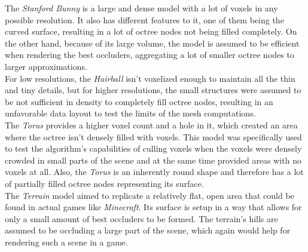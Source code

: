 \noindent
The \emph{Stanford Bunny} is a large and dense model with a lot of voxels in any possible resolution.
It also has different features to it, one of them being the curved surface, resulting in a lot of octree 
nodes not being filled completely. On the other hand, because of its large volume, the model is assumed 
to be efficient when rendering the best occluders, aggregating a lot of smaller octree nodes to larger 
approximations. \\ 

\noindent
For low resolutions, the \emph{Hairball} isn't voxelized enough to maintain all the thin and tiny details, 
but for higher resolutions, the small structures were assumed to be not sufficient in density to completely
fill octree nodes, resulting in an unfavorable data layout to test the limits of the mesh computations. \\

\noindent
The \emph{Torus} provides a higher voxel count and a hole in it, which created an area where the 
octree isn't densely filled with voxels. This model was specifically used to test the algorithm's 
capabilities of culling voxels when the voxels were densely crowded in small parts of the scene and 
at the same time provided areas with no voxels at all. Also, the \emph{Torus} is an inherently round 
shape and therefore has a lot of partially filled octree nodes representing its surface. \\

\noindent
The \emph{Terrain} model aimed to replicate a relatively flat, open area that could be found in actual 
games like \emph{Minecraft}. Its surface is setup in a way that allows for only a small amount of best 
occluders to be formed. The terrain's hills are assumed to be occluding a large part of the scene, 
which again would help for rendering such a scene in a game.


%
%
%
%
%
%


